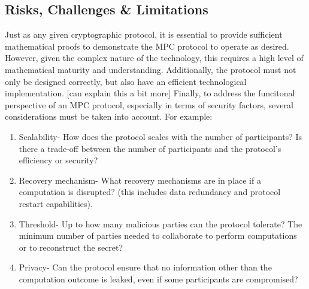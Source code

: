 \documentclass[12pt]{article}
\begin{document}
\subsection{Risks, Challenges \& Limitations}
Just as any given cryptographic protocol, it is essential to provide sufficient mathematical proofs to demonstrate the MPC protocol to operate as desired. However, given the complex nature of the technology, this requires a high level of mathematical maturity and understanding. Additionally, the protocol must not only be designed correctly, but also have an efficient technological implementation. [can explain this a bit more] Finally, to address the funcitonal perspective of an MPC protocol, especially in terms of security factors, several considerations must be taken into account. For example:
\begin{enumerate}
    \item Scalability- How does the protocol scales with the number of participants? Is there a trade-off between the number of participants and the protocol's efficiency or security?
    \item Recovery mechanism- What recovery mechanisms are in place if a computation is disrupted? (this includes data redundancy and protocol restart capabilities).
    \item Threshold- Up to how many malicious parties can the protocol tolerate? The minimum number of parties needed to collaborate to perform computations or to reconstruct the secret?
    \item Privacy- Can the protocol ensure that no information other than the computation outcome is leaked, even if some participants are compromised?
\end{enumerate}
\end{document}
